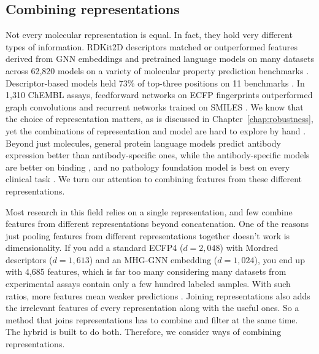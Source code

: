 \subsection{Combining representations}

Not every molecular representation is equal. In fact, they hold very different types of information. RDKit2D descriptors matched or outperformed features derived from GNN embeddings and pretrained language models on many datasets across 62,820 models on a variety of molecular property prediction benchmarks \citep{Deng2023}. Descriptor-based models held 73\% of top-three positions on 11 benchmarks \citep{Jiang2021}. In 1,310 ChEMBL assays, feedforward networks on ECFP fingerprints outperformed graph convolutions and recurrent networks trained on SMILES \citep{Mayr2018}. We know that the choice of representation matters, as is discussed in Chapter~\ref{chap:robustness}, yet the combinations of representation and model are hard to explore by hand \citep{Lanini2023PREFER}. Beyond just molecules, general protein language models predict antibody expression better than antibody-specific ones, while the antibody-specific models are better on binding \citep{Kenlay2024}, and no pathology foundation model is best on every clinical task \citep{ElNahhas2025}. We turn our attention to combining features from these different representations. 

Most research in this field relies on a single representation, and few combine features from different representations beyond concatenation. One of the reasons just pooling features from different representations together doesn't work is dimensionality. If you add a standard ECFP4 ($d=2,048$) with Mordred descriptors ($d=1,613$) and an MHG-GNN embedding ($d=1,024$), you end up with 4,685 features, which is far too many considering many datasets from experimental assays contain only a few hundred labeled samples. With such ratios, more features mean weaker predictions \citep{Hughes1968, Bellman1961}. Joining representations also adds the irrelevant features of every representation along with the useful ones. So a method that joins representations has to combine and filter at the same time. The hybrid is built to do both. Therefore, we consider ways of combining representations. 

